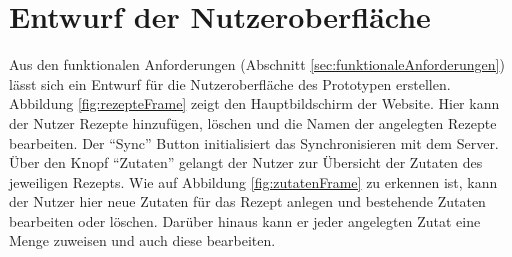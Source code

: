 \documentclass[a4paper, 12pt]{scrreprt}
\begin{document}
\section{Entwurf der Nutzeroberfläche}

Aus den funktionalen Anforderungen (Abschnitt \ref{sec:funktionaleAnforderungen}) lässt sich ein Entwurf für die Nutzeroberfläche des Prototypen erstellen. Abbildung \ref{fig:rezepteFrame} zeigt den Hauptbildschirm der Website. Hier kann der Nutzer Rezepte hinzufügen, löschen und die Namen der angelegten Rezepte bearbeiten. Der \enquote{Sync} Button initialisiert das Synchronisieren mit dem Server. Über den Knopf \enquote{Zutaten} gelangt der Nutzer zur Übersicht der Zutaten des jeweiligen Rezepts. Wie auf Abbildung \ref{fig:zutatenFrame} zu erkennen ist, kann der Nutzer hier neue Zutaten für das Rezept anlegen und bestehende Zutaten bearbeiten oder löschen. Darüber hinaus kann er jeder angelegten Zutat eine Menge zuweisen und auch diese bearbeiten. 
\end{document}
